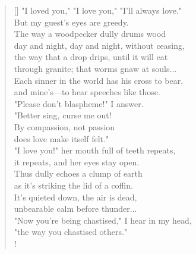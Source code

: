\documentclass[]{article}
\begin{document}
\vspace*{0.0075\textheight}
\settowidth{\versewidth}{through granite; that worms gnaw at souls}
\begin{verse}[\versewidth]
"I loved you," "I love you," "I'll always love."\\
But my guest's eyes are greedy.\\
The way a woodpecker dully drums wood\\
day and night, day and night, without ceasing,\\
the way that a drop drips, until it will eat\\
through granite; that worms gnaw at souls...\\
Each sinner in the world has his cross to bear,\\
and mine's—to hear speeches like those.\\
"Please don't blaspheme!" I answer.\\
"Better sing, curse me out!\\
By compassion, not passion\\
does love make itself felt."\\
"I love you!" her mouth full of teeth repeats,\\
it repeats, and her eyes stay open.\\
Thus dully echoes a clump of earth\\
as it's striking the lid of a coffin.\\
It's quieted down, the air is dead,\\
unbearable calm before thunder...\\
"Now you're being chastised," I hear in my head,\\
"the way you chastised others."\\!
\end{verse}
\bigskip \bigskip
\end{document}
